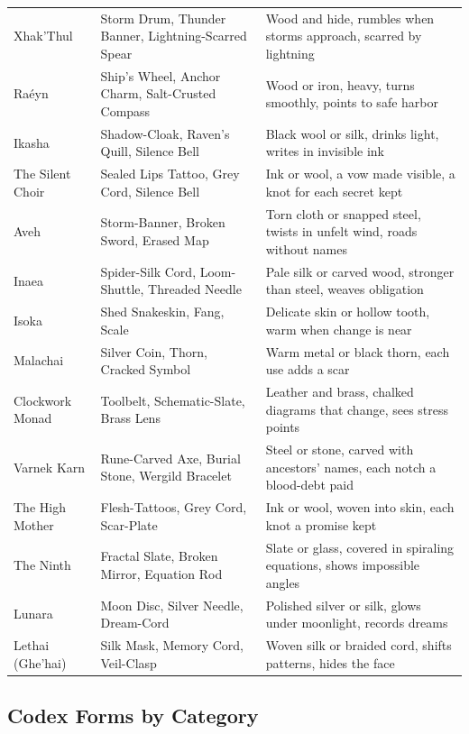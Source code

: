 \begin{table}[h]
\begin{tabular}{lll}
Xhak'Thul & Storm Drum, Thunder Banner, Lightning-Scarred Spear & Wood and hide, rumbles when storms approach, scarred by lightning \\
Raéyn & Ship's Wheel, Anchor Charm, Salt-Crusted Compass & Wood or iron, heavy, turns smoothly, points to safe harbor \\
\hline
Ikasha & Shadow-Cloak, Raven's Quill, Silence Bell & Black wool or silk, drinks light, writes in invisible ink \\
The Silent Choir & Sealed Lips Tattoo, Grey Cord, Silence Bell & Ink or wool, a vow made visible, a knot for each secret kept \\
Aveh & Storm-Banner, Broken Sword, Erased Map & Torn cloth or snapped steel, twists in unfelt wind, roads without names \\
\hline
Inaea & Spider-Silk Cord, Loom-Shuttle, Threaded Needle & Pale silk or carved wood, stronger than steel, weaves obligation \\
Isoka & Shed Snakeskin, Fang, Scale & Delicate skin or hollow tooth, warm when change is near \\
Malachai & Silver Coin, Thorn, Cracked Symbol & Warm metal or black thorn, each use adds a scar \\
\hline
Clockwork Monad & Toolbelt, Schematic-Slate, Brass Lens & Leather and brass, chalked diagrams that change, sees stress points \\
\hline
Varnek Karn & Rune-Carved Axe, Burial Stone, Wergild Bracelet & Steel or stone, carved with ancestors' names, each notch a blood-debt paid \\
The High Mother & Flesh-Tattoos, Grey Cord, Scar-Plate & Ink or wool, woven into skin, each knot a promise kept \\
\hline
The Ninth & Fractal Slate, Broken Mirror, Equation Rod & Slate or glass, covered in spiraling equations, shows impossible angles \\
Lunara & Moon Disc, Silver Needle, Dream-Cord & Polished silver or silk, glows under moonlight, records dreams \\
\hline
Lethai (Ghe'hai) & Silk Mask, Memory Cord, Veil-Clasp & Woven silk or braided cord, shifts patterns, hides the face \\
\hline
\end{tabular}
\end{table}

\subsection*{Codex Forms by Category}


